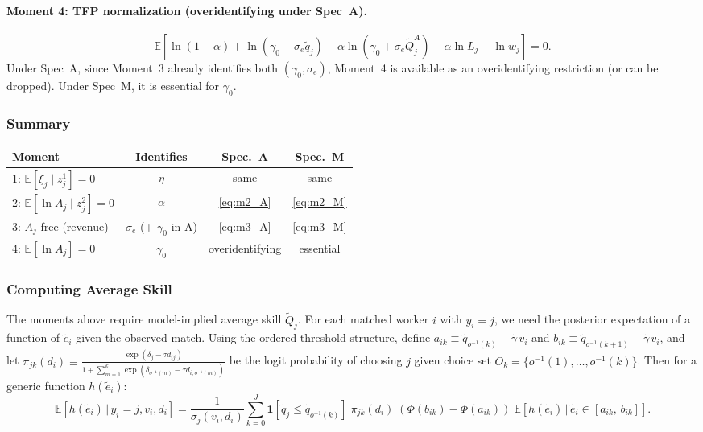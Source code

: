 \documentclass[11pt]{article}
\begin{document}
\paragraph{Moment 4: TFP normalization (overidentifying under Spec~A).}
\begin{equation}\label{eq:m4_A}
\mathbb{E}\!\left[\ln(1-\alpha) + \ln(\gamma_0+\sigma_e\tilde q_j) - \alpha\ln(\gamma_0+\sigma_e\tilde Q_j^A) - \alpha\ln L_j - \ln w_j\right] = 0.
\end{equation}
Under Spec~A, since Moment~3 already identifies both $(\gamma_0,\sigma_e)$, Moment~4 is available as an overidentifying restriction (or can be dropped). Under Spec~M, it is essential for $\gamma_0$.

\subsubsection{Summary}

\begin{center}
\begin{tabular}{lccc}
\hline
Moment & Identifies & Spec.~A & Spec.~M \\
\hline
1: $\mathbb{E}[\xi_j \mid z_j^1]=0$ & $\eta$ & same & same \\
2: $\mathbb{E}[\ln A_j \mid z_j^2]=0$ & $\alpha$ & \eqref{eq:m2_A} & \eqref{eq:m2_M} \\
3: $A_j$-free (revenue) & $\sigma_e$ (+ $\gamma_0$ in A) & \eqref{eq:m3_A} & \eqref{eq:m3_M} \\
4: $\mathbb{E}[\ln A_j]=0$ & $\gamma_0$ & overidentifying & essential \\
\hline
\end{tabular}
\end{center}

\subsubsection{Computing Average Skill}\label{sec:avg_skill}

The moments above require model-implied average skill $\tilde Q_j$. For each matched worker $i$ with $y_i = j$, we need the posterior expectation of a function of $\tilde e_i$ given the observed match. Using the ordered-threshold structure, define $a_{ik}\equiv \tilde q_{o^{-1}(k)} - \tilde\gamma\, v_i$ and $b_{ik}\equiv \tilde q_{o^{-1}(k+1)} - \tilde\gamma\, v_i$, and let $\pi_{jk}(d_i) \equiv \frac{\exp(\delta_j - \tau d_{ij})}{1+\sum_{m=1}^k\exp(\delta_{o^{-1}(m)}-\tau d_{i,o^{-1}(m)})}$ be the logit probability of choosing $j$ given choice set $O_k = \{o^{-1}(1),\ldots,o^{-1}(k)\}$. Then for a generic function $h(\tilde e_i)$:
\begin{equation}\label{eq:posterior}
\mathbb{E}\!\left[h(\tilde e_i)\,\Big|\, y_i=j, v_i, d_i\right] = \frac{1}{\sigma_j(v_i,d_i)}\sum_{k=0}^{J}\mathbf{1}[\tilde q_j \leq \tilde q_{o^{-1}(k)}]\;\pi_{jk}(d_i)\;\left(\Phi(b_{ik})-\Phi(a_{ik})\right)\;\mathbb{E}\!\left[h(\tilde e_i)\,\Big|\,\tilde e_i\in[a_{ik},\,b_{ik}]\right].
\end{equation}
\end{document}
